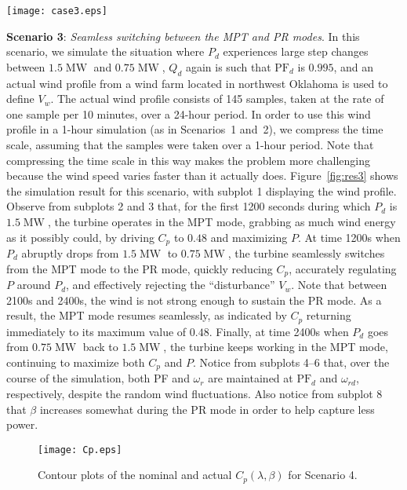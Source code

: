 \documentclass[journal]{IEEEtran}
\begin{document}
\begin{figure*}[tb]
\centering\texttt{[image: case3.eps]}
\caption{Scenario 3 illustrating the seamless switching between the MPT and PR modes under an actual wind profile from a wind farm located in northwest Oklahoma.}
\label{fig:res3}
\end{figure*}

{\bf Scenario 3}: {\em Seamless switching between the MPT and PR modes}.
In this scenario, we simulate the situation where $P_d$ experiences large step changes between $1.5\operatorname{MW}$ and $0.75\operatorname{MW}$, $Q_d$ again is such that $\text{PF}_d$ is $0.995$, and an actual wind profile from a wind farm located in northwest Oklahoma is used to define $V_w$. The actual wind profile consists of 145 samples, taken at the rate of one sample per 10 minutes, over a 24-hour period. In order to use this wind profile in a 1-hour simulation (as in Scenarios~1 and~2), we compress the time scale, assuming that the samples were taken over a 1-hour period. Note that compressing the time scale in this way makes the problem more challenging because the wind speed varies faster than it actually does. Figure~\ref{fig:res3} shows the simulation result for this scenario, with subplot 1 displaying the wind profile. Observe from subplots 2 and 3 that, for the first 1200 seconds during which $P_d$ is $1.5\operatorname{MW}$, the turbine operates in the MPT mode, grabbing as much wind energy as it possibly could, by driving $C_p$ to $0.48$ and maximizing $P$. At time 1200s when $P_d$ abruptly drops from $1.5\operatorname{MW}$ to $0.75\operatorname{MW}$, the turbine seamlessly switches from the MPT mode to the PR mode, quickly reducing $C_p$, accurately regulating $P$ around $P_d$, and effectively rejecting the ``disturbance'' $V_w$. Note that between 2100s and 2400s, the wind is not strong enough to sustain the PR mode. As a result, the MPT mode resumes seamlessly, as indicated by $C_p$ returning immediately to its maximum value of $0.48$. Finally, at time 2400s when $P_d$ goes from $0.75\operatorname{MW}$ back to $1.5\operatorname{MW}$, the turbine keeps working in the MPT mode, continuing to maximize both $C_p$ and $P$. Notice from subplots 4--6 that, over the course of the simulation, both PF and $\omega_r$ are maintained at $\text{PF}_d$ and $\omega_{rd}$, respectively, despite the random wind fluctuations. Also notice from subplot 8 that $\beta$ increases somewhat during the PR mode in order to help capture less power.

\begin{figure}[tb]
\centering\texttt{[image: Cp.eps]}
\caption{Contour plots of the nominal and actual $C_p(\lambda,\beta)$ for Scenario 4.}
\label{fig:cp}
\end{figure}
\end{document}
